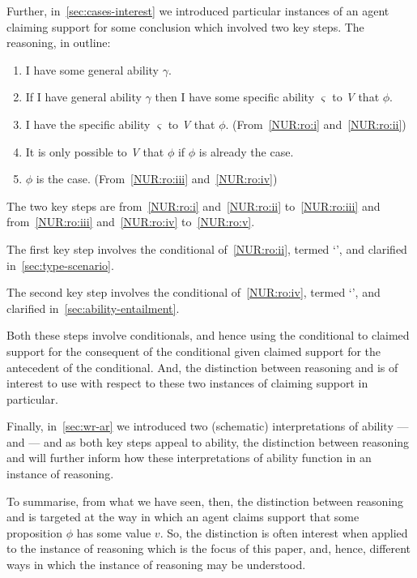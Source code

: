 \begin{note}
  Further, in~\autoref{sec:cases-interest} we introduced particular instances of an agent claiming support for some conclusion which involved two key steps.
  The reasoning, in outline:
  \begin{enumerate}[label=\arabic*., ref=(\arabic*)]
  \item\label{NUR:ro:i} I have some general ability \(\gamma\).
  \item\label{NUR:ro:ii} If I have general ability \(\gamma\) then I have some specific ability \(\varsigma\) to \emph{V} that \(\phi\).
  \item\label{NUR:ro:iii} I have the specific ability \(\varsigma\) to \emph{V} that \(\phi\). \hfill (From~\ref{NUR:ro:i} and~\ref{NUR:ro:ii})
  \item\label{NUR:ro:iv} It is only possible to \emph{V} that \(\phi\) if \(\phi\) is already the case.
  \item\label{NUR:ro:v} \(\phi\) is the case. \hfill (From~\ref{NUR:ro:iii} and~\ref{NUR:ro:iv})
  \end{enumerate}

  The two key steps are from~\ref{NUR:ro:i} and~\ref{NUR:ro:ii} to~\ref{NUR:ro:iii} and from~\ref{NUR:ro:iii} and~\ref{NUR:ro:iv} to~\ref{NUR:ro:v}.

  The first key step involves the conditional of~\ref{NUR:ro:ii}, termed `\gsi{-}', and clarified in~\autoref{sec:type-scenario}.

  The second key step involves the conditional of~\ref{NUR:ro:iv}, termed `', and clarified in~\autoref{sec:ability-entailment}.

  Both these steps involve conditionals, and hence using the conditional to claimed support for the consequent of the conditional given claimed support for the antecedent of the conditional.
  And, the distinction between reasoning \ur{} and \nr{} is of interest to use with respect to these two instances of claiming support in particular.

  Finally, in~\autoref{sec:wr-ar} we introduced two (schematic) interpretations of ability --- \AR{} and \WR{} --- and as both key steps appeal to ability, the distinction between reasoning \ur{} and \nr{} will further inform how these interpretations of ability function in an instance of reasoning.
\end{note}

\begin{note}
  To summarise, from what we have seen, then, the distinction between reasoning \ur{} and \nr{} is targeted at the way in which an agent claims support that some proposition \(\phi\) has some value \(v\).
  So, the distinction is often interest when applied to the instance of reasoning which is the focus of this paper, and, hence, different ways in which the instance of reasoning may be understood.
\end{note}

